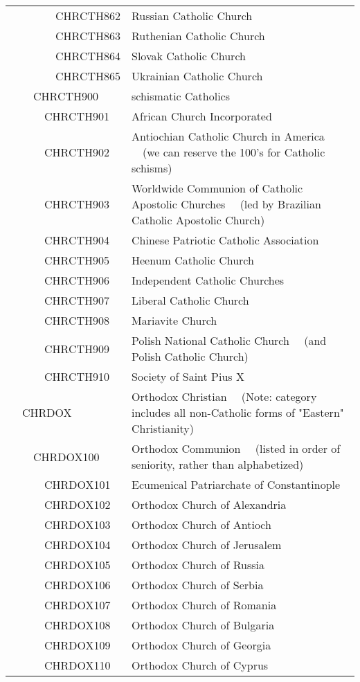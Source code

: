 \documentclass[12pt]{article}
\begin{document}
\begin{tiny}
\begin{center}
\begin{longtable}{|l|l|}
~~~~~~~~CHRCTH862 & Russian Catholic Church \\
~~~~~~~~CHRCTH863 & Ruthenian Catholic Church \\
~~~~~~~~CHRCTH864 & Slovak Catholic Church \\
~~~~~~~~CHRCTH865 & Ukrainian Catholic Church \\
~~~~CHRCTH900 & schismatic Catholics \\
~~~~~~CHRCTH901 & African Church Incorporated \\
~~~~~~CHRCTH902 & Antiochian Catholic Church in America	~~(we can reserve the 100's for Catholic schisms) \\
~~~~~~CHRCTH903 & Worldwide Communion of Catholic Apostolic Churches	~~(led by Brazilian Catholic Apostolic Church) \\
~~~~~~CHRCTH904 & Chinese Patriotic Catholic Association \\
~~~~~~CHRCTH905 & Heenum Catholic Church \\
~~~~~~CHRCTH906 & Independent Catholic Churches \\
~~~~~~CHRCTH907 & Liberal Catholic Church \\
~~~~~~CHRCTH908 & Mariavite Church \\
~~~~~~CHRCTH909 & Polish National Catholic Church	~~(and Polish Catholic Church) \\
~~~~~~CHRCTH910 & Society of Saint Pius X \\
~~CHRDOX & Orthodox Christian	~~(Note: category includes all non-Catholic forms of "Eastern" Christianity) \\
~~~~CHRDOX100 & Orthodox Communion	~~(listed in order of seniority, rather than alphabetized) \\
~~~~~~CHRDOX101 & Ecumenical Patriarchate of Constantinople \\
~~~~~~CHRDOX102 & Orthodox Church of Alexandria \\
~~~~~~CHRDOX103 & Orthodox Church of Antioch \\
~~~~~~CHRDOX104 & Orthodox Church of Jerusalem \\
~~~~~~CHRDOX105 & Orthodox Church of Russia \\
~~~~~~CHRDOX106 & Orthodox Church of Serbia \\
~~~~~~CHRDOX107 & Orthodox Church of Romania \\
~~~~~~CHRDOX108 & Orthodox Church of Bulgaria \\
~~~~~~CHRDOX109 & Orthodox Church of Georgia \\
~~~~~~CHRDOX110 & Orthodox Church of Cyprus \\

\end{longtable}
\end{center}
\end{tiny}
\end{document}
